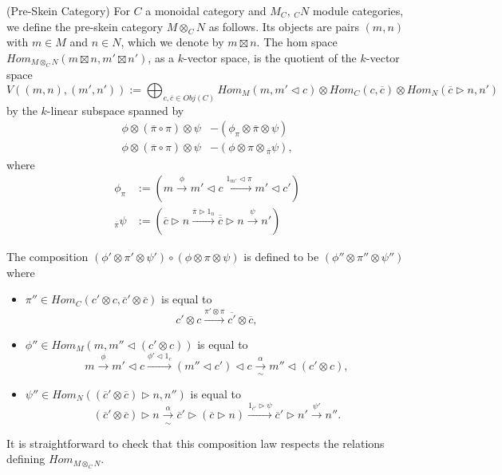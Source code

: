 \begin{definition}\label{pre-skein} (Pre-Skein Category)
  For $C$ a monoidal category and $M_C$, $_{C}N$ module categories, we define
  the pre-skein category $M\otimes_C N$ as follows. Its objects are pairs
  $(m,n)$ with $m\in M$ and $n\in N$, which we denote by $m\boxtimes n$. The
  hom space $Hom_{M\otimes_C N}(m\boxtimes n, m'\boxtimes n')$, as a
  $k$-vector space, is the quotient of the $k$-vector
  space $$V((m,n),(m',n')):=\bigoplus_{c,\overline{c} \in Obj(C)} Hom_{M}(m,
  m' \lhd c) \otimes Hom_{C}(c,\overline{c}) \otimes Hom_{N}
  (\overline{c} \rhd n, n')$$ by the $k$-linear subspace spanned by
  \begin{align}
    \phi \otimes (\overline{\pi} \circ \pi) \otimes \psi &- (\phi_{\pi} \otimes \overline{\pi} \otimes \psi) \label{relation/a} \\
    \phi \otimes (\overline{\pi} \circ \pi) \otimes \psi &- (\phi \otimes \pi \otimes {}_{\overline{\pi}}\psi) \label{relation/b},
  \end{align}
  where
  \begin{align}
    \phi_{\pi}  &:= \left( m \xrightarrow{\phi} m' \lhd c \xrightarrow{1_{m'} \lhd \pi} m' \lhd c' \right) \\
    {}_{\overline{\pi}}\psi &:= \left( \overline{c} \rhd n \xrightarrow{\overline{\pi} \rhd 1_{n}} \overline{\overline{c}} \rhd n \xrightarrow{\psi} n' \right)
  \end{align}
  
    \begin{center}
    
  \end{center}
  
  \noindent The composition $(\phi' \otimes \pi' \otimes \psi' ) \circ
  (\phi \otimes \pi \otimes \psi)$ is defined to be
  $(\phi'' \otimes \pi'' \otimes \psi'')$ where

  \begin{itemize}
    \item
    $\pi'' \in Hom_{C}(c' \otimes c, \overline{c}' \otimes \overline{c})$ is equal to
    \[
      c' \otimes c \xrightarrow{\pi' \otimes \pi} \overline{c'} \otimes \overline{c},
    \]
    \item
    \noindent $\phi'' \in Hom_{M}(m, m'' \lhd (c' \otimes c))$ is equal to
    \[
      m \xrightarrow{\phi} m' \lhd c \xrightarrow{\phi' \lhd 1_{c}} (m'' \lhd c') \lhd c \xrightarrow[\sim]{\alpha} m'' \lhd (c' \otimes c),
    \]
    \item
    \noindent $\psi'' \in Hom_{N}((\overline{c}' \otimes \overline{c}) \rhd n, n'')$ is equal to
    \[
      (\overline{c}' \otimes \overline{c}) \rhd n \xrightarrow[\sim]{\alpha} \overline{c}' \rhd (\overline{c} \rhd n) \xrightarrow{1_{\overline{c}'} \rhd \psi} \overline{c}' \rhd n' \xrightarrow{\psi'} n''.
    \]
  \end{itemize}
  
    \begin{center}
    
  \end{center}

  It is straightforward to check that this composition law respects the
  relations defining $Hom_{M\otimes_C N}$.
\end{definition}

